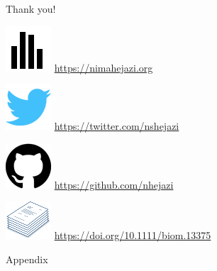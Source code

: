 \documentclass{beamer}
\begin{document}

\begin{frame}[c]{Thank you!}

\includegraphics[scale=0.14]{homepage.png} \url{https://nimahejazi.org}

\vspace{2mm}
\includegraphics[scale=0.14]{twitter-icon.png}
  \url{https://twitter.com/nshejazi}

\vspace{2mm}
\includegraphics[scale=0.11]{github-icon.png}
  \url{https://github.com/nhejazi}

\vspace{2mm}
\includegraphics[scale=0.14]{paper-icon.png}
  \url{https://doi.org/10.1111/biom.13375}

\end{frame}


\appendix
\begin{frame}[standout]
  Appendix
\end{frame}

\end{document}
